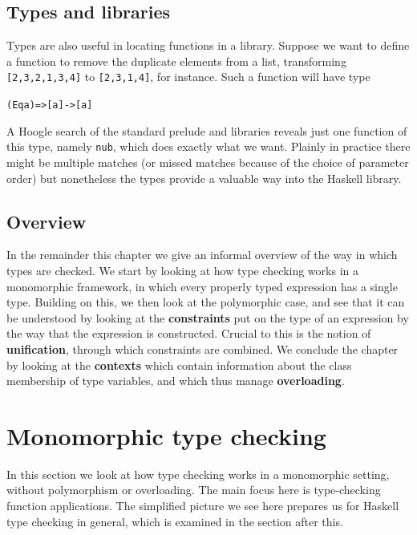 \subsection*{Types and libraries}


\noindent
Types are also useful in locating functions in a library. Suppose we want to define
a function to remove the duplicate elements from a list, transforming
\texttt{[2,3,2,1,3,4]} to \texttt{[2,3,1,4]}, for instance. Such a
function will have type
\begin{alltt}
(Eq a) => [a] -> [a]
\end{alltt}
A Hoogle search of the standard prelude and libraries reveals just one function of this type, namely
\texttt{nub}, which does exactly what we want. Plainly in practice
there might be multiple matches (or missed matches because of the choice of
parameter order) but nonetheless the types provide a valuable
way into the Haskell library.

\subsection*{Overview}

In the remainder this chapter we give an informal overview of the way in which types
are checked. We start by looking at how type checking works in a
monomorphic framework, in which every properly typed expression has a
single type.
Building on this, we then look at the polymorphic case, and see that it
can be understood by looking at the 
\textbf{constraints} put on the type
of an expression by the way that the expression is constructed. Crucial to this is the
notion of \textbf{unification}, through which constraints are combined.
We conclude the chapter by looking
at the \textbf{contexts} which contain information about the class membership of 
type variables, and which thus manage \textbf{overloading}.

\section{Monomorphic type checking}
\label{monoCheck}


In this section we look at how type checking works in a monomorphic
setting, without polymorphism or overloading. The main focus here is
type-checking function applications.
The simplified
picture we see here prepares us for Haskell type checking in 
general, which
is examined in the section after this. 

